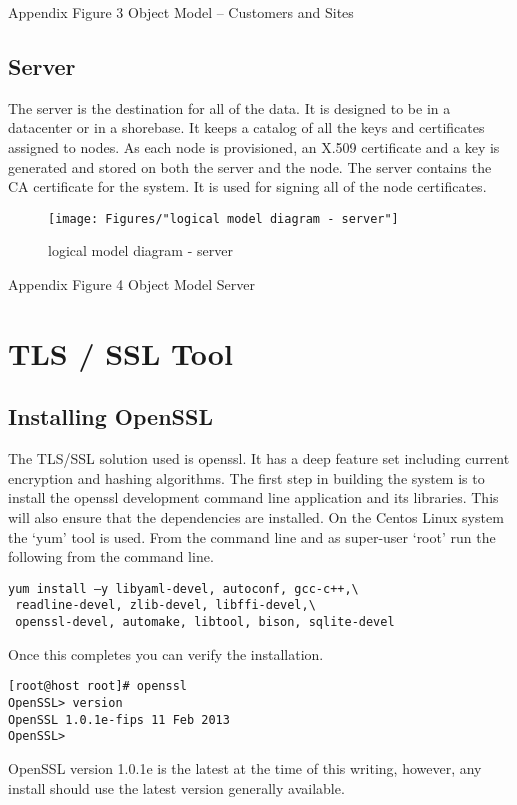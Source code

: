 Appendix Figure 3	Object Model – Customers and Sites	

\subsection{Server}
The server is the destination for all of the data.  It is designed to be in a datacenter or in a shorebase.  It keeps a catalog of all the keys and certificates assigned to nodes. As each node is provisioned, an X.509 certificate and a key is generated and stored on both the server and the node.  The server contains the CA certificate for the system. It is used for signing all of the node certificates.  
\begin{figure}
\centering
\texttt{[image: Figures/"logical model diagram - server"]}
\caption{logical model diagram - server}
\label{fig:logicalModelServers}
\end{figure}
Appendix Figure 4	Object Model Server

\section{TLS / SSL Tool}
\subsection{Installing OpenSSL}
The TLS/SSL solution used is openssl\cite{Anonymous:DuAhrSbO}.  It has a deep feature set including current encryption and hashing algorithms.  
The first step in building the system is to install the openssl development command line application and its libraries. This will also ensure that the dependencies are installed. On the Centos Linux system the ‘yum’ tool is used.  From the command line and as super-user ‘root’ run the following from the command line. \par

\begin{lstlisting}
yum install –y libyaml-devel, autoconf, gcc-c++,\
 readline-devel, zlib-devel, libffi-devel,\
 openssl-devel, automake, libtool, bison, sqlite-devel 
\end{lstlisting}
\par
Once this completes you can verify the installation. 
\begin{lstlisting}
[root@host root]# openssl
OpenSSL> version
OpenSSL 1.0.1e-fips 11 Feb 2013
OpenSSL> 
\end{lstlisting}

OpenSSL version 1.0.1e is the latest at the time of this writing, however, any install should use the latest version generally available.  

